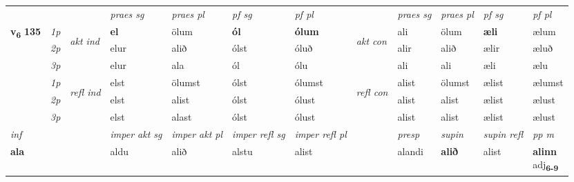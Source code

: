 \begin{longtable}[l]{X>{\footnotesize\itshape}llXXXXlXXXX}
 & &   & \textit{praes sg}  & \textit{praes pl}    & \textit{ pf sg} & \textit{pf pl} & & \textit{praes sg}  & \textit{praes pl}    & \textit{pf sg} & \textit{pf pl }  \\ \cmidrule{4-7} \cmidrule{9-12}
 \multirow{2}{*}{{{\textbf{v{\textsubscript{6}}} \Large{\textbf{135}}}}}  & 1p & \multirow{3}{*}{\begin{turn}{90}\textit{akt ind}\end{turn}} & \textbf{el} & ölum & \textbf{ól} & \textbf{ólum} & \multirow{3}{*}{\begin{turn}{90}\textit{akt con}\end{turn}} &ali & ölum & \textbf{æli} & ælum\\*
 & 2p &  &  elur  & alið & ólst & óluð & & alir & alið & ælir & æluð \\*
 & 3p &  & elur & ala & ól & ólu & & ali & ali& æli & ælu \\*
\cmidrule{4-7} \cmidrule{9-12}
 & 1p & \multirow{3}{*}{\begin{turn}{90}\textit{refl ind}\end{turn}}  & elst & ölumst & ólst & ólumst & \multirow{3}{*}{\begin{turn}{90}\textit{refl con}\end{turn}}  &alist & ölumst & ælist & ælumst \\*
 & 2p &  & elst & alist & ólst & ólust & &alist & alist & ælist & ælust \\*
 & 3p  & & elst & alast & ólst & ólust & & alist & alist& ælist & ælust \\*
\cmidrule{4-7} \cmidrule{9-12}

   {\textit{inf}} & &  & \textit{imper akt sg} & \textit{imper akt pl} & \textit{imper refl sg} & \textit{imper refl pl} && \textit{presp} & \textit{supin} & \textit{supin refl} & \textit{pp m} \\*
  {\textbf{ala}} & && aldu  & alið & alstu & alist && alandi &  \textbf{alið} & alist & \specialcell{\textbf{alinn} \\ adj\textbf{\textsubscript{6-9}}} \\*

\midrule


\end{longtable}
